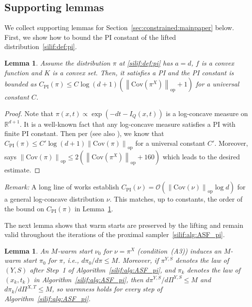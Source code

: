 \documentclass[11pt,letterpaper]{article}
\newcommand{\R}{\mathbb{R}}
\newcommand{\norm}[1]{\left\lVert #1 \right\rVert}
\newcommand{\cov}[1]{\mathrm{Cov}{\left( #1\right)}}
\newcommand{\opnorm}[1]{\norm{#1}_{\operatorname{op}}}
\newcommand{\brac}[1]{\left( #1\right)}
\newtheorem{lemma}[thm]{Lemma}
\begin{document}
\subsection{Supporting lemmas}
\label{silif:appen:supportlem}
We collect supporting lemmas for Section~\ref{sec:constrained:mainpaper} below. First, we show how to bound the PI constant of the lifted distribution~\eqref{silif:def:pi}. 



\begin{lemma}
\label{silif:lem:PIconstant}
    Assume the distribution $\pi$ at \eqref{silif:def:pi} has $a=d$, $f$ is a convex function and $K$ is a convex set. Then, it satisfies a PI and the PI constant is bounded as $  C_{\mathrm{PI}}(\pi)\leq C\log (d+1)\brac{\opnorm{\cov{\pi^X}}+1 }$ for a universal constant $C$. 
\end{lemma}

\begin{proof}   Note that $\pi(x,t)\propto \exp\brac{-dt-I_Q(x,t)}$ is a log-concave measure on $\R^{d+1}$. It is a well-known fact \cite{kannan1995isoperimetric,bobkov1999isoperimetric} that any log-concave measure satisfies a PI with finite PI constant. Then per \cite[Remark 7.12]{klartag2025lecturenoteisoperimetric} (see also \cite{klartag2023logarithmic}), we know that $ C_{\mathrm{PI}}(\pi)\leq C'\log (d+1) \opnorm{\cov{\pi}}$
for a universal constant $C'$. Moreover, \cite[Lemma 2.5]{kook2025algodiffusion} says $\opnorm{\cov{\pi}}\leq 2\brac{\opnorm{\cov{\pi^X}}+160 }$ which leads to the desired estimate. 
\end{proof}

\textit{Remark:}
    A long line of works \cite{cheeger2015lower,kannan1995isoperimetric,lee2024eldan,chen2021almost,klartag2022bourgain,klartag2023logarithmic} establish $C_{\mathrm{PI}}(\nu)=  \mathcal{O}\brac{\opnorm{\cov {\nu}}\log d}$ for a general log-concave distribution $\nu$. This matches, up to constants, the order of the bound on $C_{\mathrm{PI}}(\pi)$ in Lemma~\ref{silif:lem:PIconstant}.




The next lemma shows that warm starts are preserved by the lifting and remain valid throughout the iterations of the proximal sampler~\eqref{silif:alg:ASF_pi}. 

\begin{lemma}\label{silif:lem:warmstart} 
An $M$-warm start $\nu_0$ for $\nu=\pi^X$ (condition~(A3)) induces an $M$-warm start $\pi_0$ for $\pi$, i.e., $d\pi_0/d\pi\le M$. Moreover, if $\pi^{Y,S}$ denotes the law of $(Y,S)$ after Step~1 of Algorithm~\ref{silif:alg:ASF_pi}, and $\pi_k$ denotes the law of $(x_k,t_k)$ in Algorithm~\ref{silif:alg:ASF_pi}, then $d\pi^{Y,S}/d\Pi^{Y,S}\le M$ and $d\pi_k/d\Pi^{X,T}\le M$, so warmness holds for every step of Algorithm~\ref{silif:alg:ASF_pi}.
\end{lemma}
\end{document}
